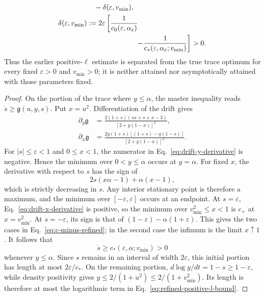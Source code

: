 \begin{theorem}
\begin{equation}
\begin{aligned}
&\quad-\delta(\varepsilon,v_{\mathrm{min}}),\\
\delta(\varepsilon,v_{\mathrm{min}})
&:=2\varepsilon\left[
\frac1{c_0(\varepsilon,\alpha_\varepsilon)}
\right.\\
&\left.\hspace{2.4cm}
-\frac1{c_*(\varepsilon,\alpha_\varepsilon;v_{\mathrm{min}})}
\right]>0.
\end{aligned}
\label{eq:strict-gap-from-old-optimum}
\end{equation}
Thus the earlier positive-$\ell$ estimate is separated from the true
trace optimum for every fixed $\varepsilon>0$ and
$v_{\mathrm{min}}>0$; it is neither
attained nor asymptotically attained with those parameters fixed.
\end{theorem}

\begin{proof}
On the portion of the trace where $y\leqslant\alpha$, the master
inequality reads $\dot s\geqslant\mathfrak g(u,y,s)$. Put $x=u^2$.
Differentiation of the drift gives
\begin{align}
\partial_y\mathfrak g
&=\frac{2(1+s)(sx+s+x-3)}{[2+y(1-x)]^2},
\label{eq:drift-y-derivative}\\
\partial_x\mathfrak g
&=\frac{2y(1+s)[(1+s)-y(1-s)]}{[2+y(1-x)]^2}.
\label{eq:drift-x-derivative}
\end{align}
For $|s|\leqslant\varepsilon<1$ and $0\leqslant x<1$, the numerator in
Eq.~\eqref{eq:drift-y-derivative} is negative. Hence the minimum over
$0<y\leqslant\alpha$ occurs at $y=\alpha$. For fixed $x$, the derivative
with respect to $s$ has the sign of
$$
2s(x\alpha-1)+\alpha(x-1),
$$
which is strictly decreasing in $s$. Any interior stationary point is
therefore a maximum, and the minimum over
$[-\varepsilon,\varepsilon]$ occurs at an endpoint. At
$s=\varepsilon$, Eq.~\eqref{eq:drift-x-derivative} is positive, so the
minimum over $v_{\mathrm{min}}^2\leqslant x<1$ is $c_+$ at
$x=v_{\mathrm{min}}^2$. At
$s=-\varepsilon$, its sign is that of
$(1-\varepsilon)-\alpha(1+\varepsilon)$. This gives the two cases in
Eq.~\eqref{eq:c-minus-refined}; in the second case the infimum is the
limit $x\uparrow1$. It follows that
$$
\dot s\geqslant c_*(\varepsilon,\alpha;v_{\mathrm{min}})>0
$$
whenever $y\leqslant\alpha$. Since $s$ remains in an interval of width
$2\varepsilon$, this initial portion has length at most
$2\varepsilon/c_*$. On the remaining portion,
$d\log y/dt=1-s\geqslant1-\varepsilon$, while density positivity gives
$y\leqslant2/(1+u^2)\leqslant2/(1+v_{\mathrm{min}}^2)$. Its length is
therefore at most
the logarithmic term in Eq.~\eqref{eq:refined-positive-l-bound}.


\end{proof}
